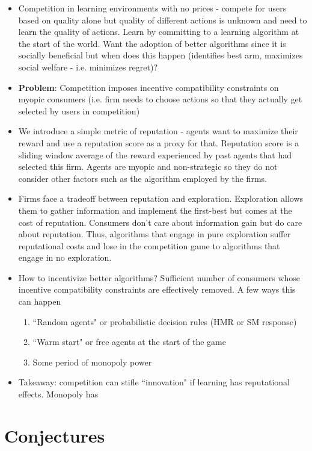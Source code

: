 \documentclass[11pt,letterpaper]{article}
\begin{document}
\begin{itemize}
\item Competition in learning environments with no prices - compete for users based on quality alone but quality of different actions is unknown and need to learn the quality of actions. Learn by committing to a learning algorithm at the start of the world. Want the adoption of better algorithms since it is socially beneficial but when does this happen (identifies best arm, maximizes social welfare - i.e. minimizes regret)?
\item \textbf{Problem}: Competition imposes incentive compatibility constraints on myopic consumers (i.e. firm needs to choose actions so that they actually get selected by users in competition)
\item We introduce a simple metric of reputation - agents want to maximize their reward and use a reputation score as a proxy for that. Reputation score is a sliding window average of the reward experienced by past agents that had selected this firm. Agents are myopic and non-strategic so they do not consider other factors such as the algorithm employed by the firms.
\item Firms face a tradeoff between reputation and exploration. Exploration allows them to gather information and implement the first-best but comes at the cost of reputation. Consumers don't care about information gain but do care about reputation. Thus, algorithms that engage in pure exploration suffer reputational costs and lose in the competition game to algorithms that engage in no exploration.
\item How to incentivize better algorithms? Sufficient number of consumers whose incentive compatibility constraints are effectively removed. A few ways this can happen
\begin{enumerate}
\item ``Random agents" or probabilistic decision rules (HMR or SM response)
\item ``Warm start" or free agents at the start of the game
\item Some period of monopoly power
\end{enumerate}
\item Takeaway: competition can stifle ``innovation" if learning has reputational effects. Monopoly has 

\end{itemize}


\pagebreak

\section*{Conjectures}
\end{document}

